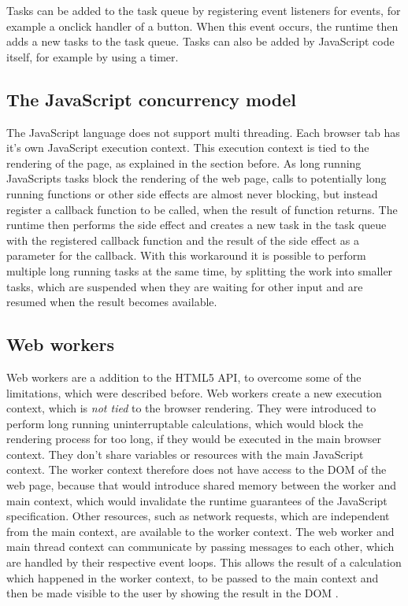 \documentclass[article,type=bsc,colorback,accentcolor=tud9c]{tudthesis}
\begin{document}
  Tasks can be added to the task queue by registering event listeners for events, for example a onclick handler of a button. When this event occurs, the runtime then adds a new tasks to the task queue. Tasks can also be added by JavaScript code itself, for example by using a timer.

  
  \subsection{The JavaScript concurrency model}
  
  The JavaScript language does not support multi threading. Each browser tab has it's own JavaScript execution context. This execution context is tied to the rendering of the page, as explained in the section before. As long running JavaScripts tasks block the rendering of the web page, calls to potentially long running functions or other side effects are almost never blocking, but instead register a callback function to be called, when the result of function returns. The runtime then performs the side effect and creates a new task in the task queue with the registered callback function and the result of the side effect as a parameter for the callback. With this workaround it is possible to perform multiple long running tasks at the same time, by splitting the work into smaller tasks, which are suspended when they are waiting for other input and are resumed when the result becomes available.
  
  
  \subsection{Web workers}

  Web workers are a addition to the HTML5 API, to overcome some of the limitations, which were described before. Web workers create a new execution context, which is \textit{not tied} to the browser rendering. They were introduced to perform long running uninterruptable calculations, which would block the rendering process for too long, if they would be executed in the main browser context. They don't share variables or resources with the main JavaScript context. The worker context therefore does not have access to the DOM of the web page, because that would introduce shared memory between the worker and main context, which would invalidate the runtime guarantees of the JavaScript specification. Other resources, such as network requests, which are independent from the main context, are available to the worker context. The web worker and main thread context can communicate by passing messages to each other, which are handled by their respective event loops. This allows the result of a calculation which happened in the worker context, to be passed to the main context and then be made visible to the user by showing the result in the DOM
  .
\end{document}

